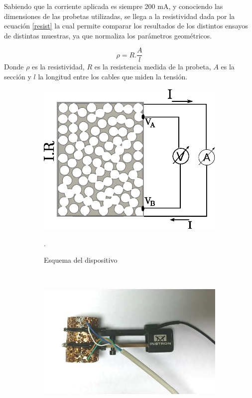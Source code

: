\documentclass[a4paper,12pt,fleqn,twoside,openany]{book}
\begin{document}
Sabiendo que la corriente aplicada es siempre 200 mA, y conociendo las dimensiones de las probetas utilizadas, se llega a la resistividad dada por la 
ecuación \ref{resist} la cual permite comparar los resultados de los distintos ensayos de distintas muestras, ya que normaliza los parámetros geométricos.

\begin{equation}
 \rho = R . \frac{A}{l} \label{resist} 
\end{equation}
Donde $\rho$ es la resistividad, $R$ es la resistencia medida de la probeta, $A$ es la sección y $l$ la longitud entre los cables que miden la tensión.

 
 
 \begin{figure}
    \centering
    \begin{subfigure}{0.4\textwidth}
        \includegraphics[width=\textwidth]{Img/Procedimiento/CuatroPuntas1.eps}
	\caption{Esquema del dispositivo}. 
	\label{fig:CuatroPuntas}
    \end{subfigure}
    ~ %
    \begin{subfigure}{0.4\textwidth}
        \includegraphics[width=\textwidth]{Img/Procedimiento/cpfoto.jpg}

\end{subfigure}
\end{figure}
\end{document}
